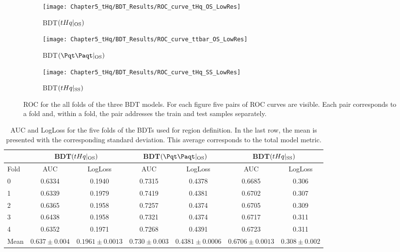 \begin{figure}[h]
  \centering  
  \begin{subfigure}[b]{0.31\textwidth}
    \centering
    \texttt{[image: Chapter5\_tHq/BDT\_Results/ROC\_curve\_tHq\_OS\_LowRes]}
    \caption{BDT$(tHq|_{\text{OS}})$}
     \label{fig:ChaptH:EventSelection:BDT:ROC_Curves:tHqOS}
  \end{subfigure}
  \hfill
  \begin{subfigure}[b]{0.31\textwidth}
    \centering
    \texttt{[image: Chapter5\_tHq/BDT\_Results/ROC\_curve\_ttbar\_OS\_LowRes]}
    \caption{BDT$(\ttbar|_{\text{OS}})$}
     \label{fig:ChaptH:EventSelection:BDT:ROC_Curves:ttbarOS}
  \end{subfigure}
    \hfill
  \begin{subfigure}[b]{0.31\textwidth}
    \centering
    \texttt{[image: Chapter5\_tHq/BDT\_Results/ROC\_curve\_tHq\_SS\_LowRes]}
    \caption{BDT$(tHq|_{\text{SS}})$}
     \label{fig:ChaptH:EventSelection:BDT:ROC_Curves:tHqSS}
  \end{subfigure}
  \caption{ROC for the all folds of the three BDT models. For each figure five pairs of ROC curves are visible. 
  Each pair corresponds to a fold and, within a fold, the pair addresses the train and test samples separately. }
  \label{fig:ChaptH:EventSelection:BDT:ROC_Curves}
\end{figure}

\begin{table}[h]
\centering
 \begin{adjustbox}{max width=0.99\textwidth}
\begin{tabular}{l|cc|cc|cc}
\cline{2-7}
\multicolumn{1}{c|}{} & \multicolumn{2}{c|}{BDT$(tHq|_{\text{OS}})$} & \multicolumn{2}{c|}{BDT$(\ttbar|_{\text{OS}})$} & \multicolumn{2}{c}{BDT$(tHq|_{\text{SS}})$} \\  \midrule
Fold 		& AUC    			& LogLoss 		& AUC    		& LogLoss 		& AUC    		& LogLoss \\  \midrule
0    		& 0.6334 			& 0.1940   		& 0.7315 		& 0.4378   		& 0.6685 		& 0.306   \\
1    		& 0.6339 			& 0.1979   		& 0.7419 		& 0.4381   		& 0.6702 		& 0.307   \\
2    		& 0.6365 			& 0.1958   		& 0.7257 		& 0.4374   		& 0.6705 		& 0.309   \\
3    		& 0.6438 			& 0.1958   		& 0.7321 		& 0.4374   		& 0.6717 		& 0.311   \\
4    		& 0.6352 			& 0.1971   		& 0.7268 		& 0.4391   		& 0.6723 		& 0.311   \\  \midrule
Mean     & $0.637\pm0.004$&$0.1961\pm0.0013$&$0.730 \pm 0.003$&$0.4381\pm 0.0006$&$0.6706 \pm0.0013$&$0.308\pm 0.002$  \\ \bottomrule
\end{tabular}
\end{adjustbox}
\caption{AUC and LogLoss for the five 
folds of the BDTs used for region definition. 
In the last row, the mean is presented with the corresponding standard deviation.
This average corresponds to the total model metric.}
\label{tab:ChaptH:EventSelection:BDT:Metrics}
\end{table}


